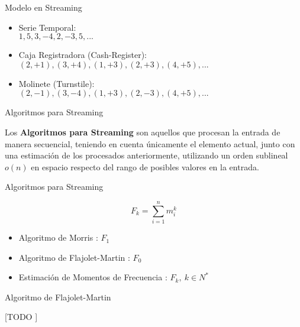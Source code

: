 \documentclass[12pt]{beamer}
\begin{document}
    \begin{frame}[fragile]{Modelo en Streaming}

    \begin{itemize}
      \item Serie Temporal:\\
        $1, 5, 3, -4, 2, -3, 5,...$
      \item Caja Registradora (Cash-Register): \\
        $(2, +1), (3, +4), (1, +3), (2, +3), (4, +5),...$
      \item Molinete (Turnstile): \\
        $(2, -1), (3, -4), (1, +3), (2, -3), (4, +5),...$
    \end{itemize}

  \end{frame}

    \begin{frame}[fragile]{Algoritmos para Streaming}

      Los \textbf{Algoritmos para Streaming} son aquellos que procesan la entrada de manera secuencial, teniendo en cuenta únicamente el elemento actual, junto con una estimación de los procesados anteriormente, utilizando un orden sublineal $o(n)$ en espacio respecto del rango de posibles valores en la entrada.

    \end{frame}

    \begin{frame}[fragile]{Algoritmos para Streaming}

      \begin{equation}
        F_k = \sum_{i=1}^n m_i^k
      \end{equation}

      \begin{itemize}
        \item Algoritmo de Morris \cite{morris1978counting}: $F_1$
        \item Algoritmo de Flajolet-Martin \cite{flajolet1985probabilistic}: $F_0$
        \item Estimación de Momentos de Frecuencia \cite{alon1996space}: $F_k, \ k \in N^*$
      \end{itemize}

    \end{frame}

    \begin{frame}[fragile]{Algoritmo de Flajolet-Martin}

      [TODO ]

    \end{frame}
\end{document}
